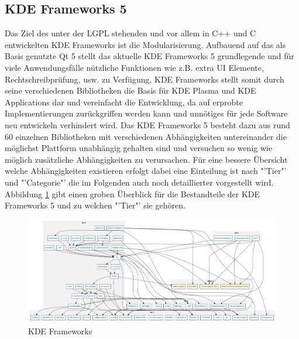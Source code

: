 \subsection{KDE Frameworks 5}
Das Ziel des unter der LGPL stehenden und vor allem in C++ und C entwickelten KDE Frameworks ist die Modularisierung. Aufbauend auf das als Basis genutzte Qt 5 stellt das aktuelle KDE Frameworks 5 grundlegende und für viele Anwendungsfälle nützliche Funktionen wie z.B. extra UI Elemente, Rechtschreibprüfung, usw. zu Verfügung. KDE Frameworks stellt somit durch seine verschiedenen Bibliotheken die Basis für KDE Plasma und KDE Applications dar und vereinfacht die Entwicklung, da auf erprobte Implementierungen zurückgriffen werden kann und unnötiges für jede Software neu entwickeln verhindert wird. Das KDE Frameworks 5 besteht dazu aus rund 60 einzelnen Bibliotheken mit verschiedenen Abhängigkeiten untereinander die möglichst Plattform unabhängig gehalten sind und versuchen so wenig wie möglich zusätzliche Abhängigkeiten zu verursachen. Für eine bessere Übersicht welche Abhängigkeiten existieren erfolgt dabei eine Einteilung ist nach "'Tier"' und "'Categorie"' die im Folgenden auch noch detaillierter vorgestellt wird. Abbildung \ref{fig:kde_frameworks} gibt einen groben Überblick für die Bestandteile der KDE Frameworks 5 und zu welchen "'Tier"' sie gehören.

\begin{figure}[h]
	\centering
	\includegraphics[width=\columnwidth]{images/kf5_big_0.png}
	\caption{KDE Frameworks}
	\label{fig:kde_frameworks}
\end{figure}


